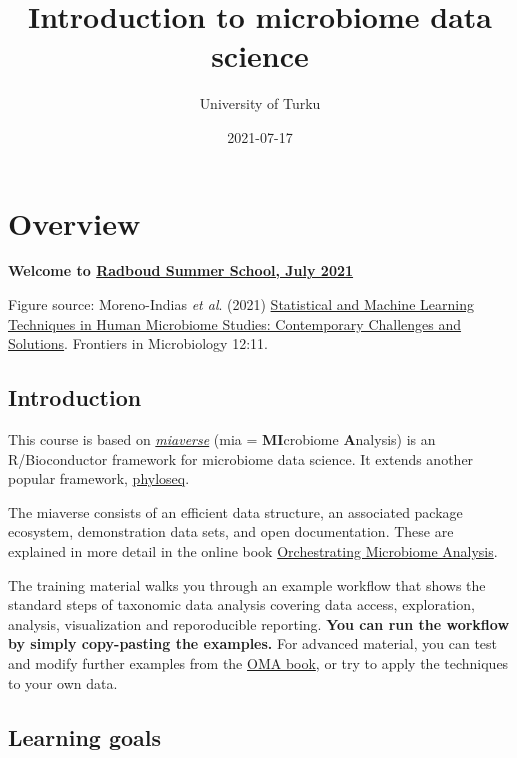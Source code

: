 \documentclass[
  oneside]{book}
\title{Introduction to microbiome data science}
\author{University of Turku}
\date{2021-07-17}
\begin{document}
\maketitle

{
\setcounter{tocdepth}{1}
\tableofcontents
}
\hypertarget{overview}{%
\chapter{Overview}\label{overview}}

\textbf{Welcome to \href{https://www.ru.nl/radboudsummerschool/courses/2021/brain-bacteria-behaviour/}{Radboud Summer School, July 2021}}

Figure source: Moreno-Indias \emph{et al}. (2021) \href{https://doi.org/10.3389/fmicb.2021.635781}{Statistical and Machine Learning Techniques in Human Microbiome Studies: Contemporary Challenges and Solutions}. Frontiers in Microbiology 12:11.

\hypertarget{introduction}{%
\section{Introduction}\label{introduction}}

This course is based on \href{https://microbiome.github.io}{\emph{miaverse}} (mia = \textbf{MI}crobiome \textbf{A}nalysis) is an
R/Bioconductor framework for microbiome data science. It extends another popular framework, \href{https://joey711.github.io/phyloseq/}{phyloseq}.

The miaverse consists of an efficient data structure, an
associated package ecosystem, demonstration data sets, and open
documentation. These are explained in more detail in the online book
\href{https://microbiome.github.io/OMA}{Orchestrating Microbiome Analysis}.

The training material walks you through an example workflow that
shows the standard steps of taxonomic data analysis covering data
access, exploration, analysis, visualization and reporoducible
reporting. \textbf{You can run the workflow by simply copy-pasting the
examples.} For advanced material, you can test and modify further
examples from the \href{https://microbiome.github.io/OMA}{OMA book}, or try
to apply the techniques to your own data.

\hypertarget{learning-goals}{%
\section{Learning goals}\label{learning-goals}}
\end{document}

